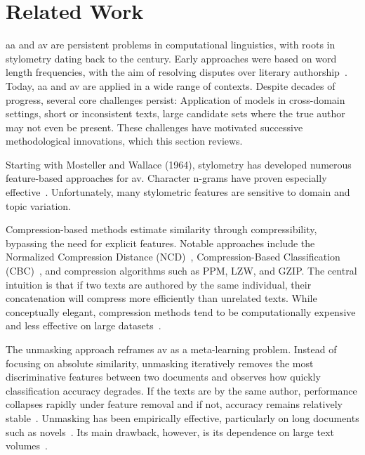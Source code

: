 \label{chap:related_work}
\chapter{Related Work}



\ac{aa} and \ac{av} are persistent problems in computational linguistics, with roots in stylometry dating back to the  century. 
Early approaches were based on word length frequencies, with the aim of resolving disputes over literary authorship~\citep{neal_surveying_2018,stamatatos_survey_2009}.
Today, \ac{aa} and \ac{av} are applied in a wide range of contexts. 
Despite decades of progress, several core challenges persist: 
Application of models in cross-domain settings, short or inconsistent texts, large candidate sets where the true author may not even be present. 
These challenges have motivated successive methodological innovations, which this section reviews.

Starting with Mosteller and Wallace (1964), stylometry has developed numerous feature-based approaches for \ac{av}. 
Character n-grams have proven especially effective~\citep{tyo_state_2022,altakrori_topic_2021}. 
Unfortunately, many stylometric features are sensitive to domain and topic variation.

Compression-based methods estimate similarity through compressibility, bypassing the need for explicit features. 
Notable approaches include the Normalized Compression Distance (NCD)~\citep{elmanarelbouanani_authorship_2014}, Compression-Based Classification (CBC)~\citep{bevendorff_divergence_based_2020,bevendorff_overview_2024}, and compression algorithms such as PPM, LZW, and GZIP. 
The central intuition is that if two texts are authored by the same individual, their concatenation will compress more efficiently than unrelated texts. 
While conceptually elegant, compression methods tend to be computationally expensive and less effective on large datasets~\citep{tyo_state_2022}. 

The unmasking approach reframes \ac{av} as a meta-learning problem. 
Instead of focusing on absolute similarity, unmasking iteratively removes the most discriminative features between two documents and observes how quickly classification accuracy degrades. 
If the texts are by the same author, performance collapses rapidly under feature removal and if not, accuracy remains relatively stable~\citep{koppel_authorship_2004}. 
Unmasking has been empirically effective, particularly on long documents such as novels~\citep{koppel_authorship_2011}. 
Its main drawback, however, is its dependence on large text volumes~\citep{koppel_determining_2014,bevendorff_generalizing_2019}.

